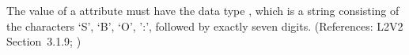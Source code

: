 The value of a  attribute must have the data type
, which is a string consisting of the characters `S', `B',
`O', ':', followed by exactly seven digits.  (References: L2V2 
Section~3.1.9; )
